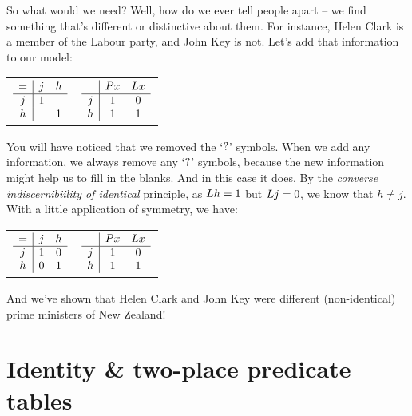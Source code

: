 \documentclass[PHIL101-Textbook.tex]{subfiles}
\begin{document}
So what would we need? Well, how do we ever tell people apart -- we find something that's different or distinctive about them. For instance, Helen Clark is a member of the Labour party, and John Key is not. Let's add that information to our model:


\begin{center}
  \begin{tabular}{ll}
  $\begin{array}{c|cc}
	   = & j & h\\ \hline
	   j &1&   \\
	   h &   &1
	 \end{array}$  & 
					 $\begin{array}{c|cc}
	   & \mathord{P}{x} & \mathord{L}{x} \\ \hline
	   j & 1 & 0\\
	   h & 1 & 1
	 \end{array}$
  \end{tabular}
\end{center}

You will have noticed that we removed the `$?$' symbols. When we add any information, we always remove any `$?$' symbols, because the new information might help us to fill in the blanks. And in this case it does. By the \emph{converse indiscernibiility of identical} principle, as $\mathord{L}{h} = 1$ but $\mathord{L}{j} = 0$, we know that $h\neq j$. With a little application of symmetry, we have:

\begin{center}
  \begin{tabular}{ll}
  $\begin{array}{c|cc}
	   = & j & h\\ \hline
	   j &1& 0 \\
	   h &0& 1
	 \end{array}$  & 
					 $\begin{array}{c|cc}
	   & \mathord{P}{x} & \mathord{L}{x} \\ \hline
	   j & 1 & 0\\
	   h & 1 & 1
	 \end{array}$
  \end{tabular}
\end{center}

And we've shown that Helen Clark and John Key were different (non-identical) prime ministers of New Zealand!
\pagebreak





\section{Identity \& two-place predicate tables}
\end{document}

